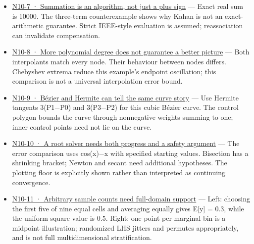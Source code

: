 \begin{itemize}
\item
  \href{Continuous\%20Notes/Computing\%20Foundations\%20-\%20From\%20Bits\%20to\%20C++\%20and\%20Systems\%20APIs\#Figure\%20N10-7\%20—\%20Summation\%20is\%20an\%20algorithm,\%20not\%20just\%20a\%20plus\%20sign}{N10-7 · Summation is an algorithm, not just a plus sign} --- Exact real sum is 10000. The three-term counterexample shows why Kahan is not an exact-arithmetic guarantee. Strict IEEE-style evaluation is assumed; reassociation can invalidate compensation.
\item
  \href{Continuous\%20Notes/Computing\%20Foundations\%20-\%20From\%20Bits\%20to\%20C++\%20and\%20Systems\%20APIs\#Figure\%20N10-8\%20—\%20More\%20polynomial\%20degree\%20does\%20not\%20guarantee\%20a\%20better\%20picture}{N10-8 · More polynomial degree does not guarantee a better picture} --- Both interpolants match every node. Their behaviour between nodes differs. Chebyshev extrema reduce this example's endpoint oscillation; this comparison is not a universal interpolation error bound.
\item
  \href{Continuous\%20Notes/Computing\%20Foundations\%20-\%20From\%20Bits\%20to\%20C++\%20and\%20Systems\%20APIs\#Figure\%20N10-9\%20—\%20Bézier\%20and\%20Hermite\%20can\%20tell\%20the\%20same\%20curve\%20story}{N10-9 · Bézier and Hermite can tell the same curve story} --- Use Hermite tangents 3(P1−P0) and 3(P3−P2) for this cubic Bézier curve. The control polygon bounds the curve through nonnegative weights summing to one; inner control points need not lie on the curve.
\item
  \href{Continuous\%20Notes/Computing\%20Foundations\%20-\%20From\%20Bits\%20to\%20C++\%20and\%20Systems\%20APIs\#Figure\%20N10-10\%20—\%20A\%20root\%20solver\%20needs\%20both\%20progress\%20and\%20a\%20safety\%20argument}{N10-10 · A root solver needs both progress and a safety argument} --- The error comparison uses cos(x)−x with specified starting values. Bisection has a shrinking bracket; Newton and secant need additional hypotheses. The plotting floor is explicitly shown rather than interpreted as continuing convergence.
\item
  \href{Continuous\%20Notes/Computing\%20Foundations\%20-\%20From\%20Bits\%20to\%20C++\%20and\%20Systems\%20APIs\#Figure\%20N10-11\%20—\%20Arbitrary\%20sample\%20counts\%20need\%20full-domain\%20support}{N10-11 · Arbitrary sample counts need full-domain support} --- Left: choosing the first five of nine equal cells and averaging equally gives E{[}y{]} = 0.3, while the uniform-square value is 0.5. Right: one point per marginal bin is a midpoint illustration; randomized LHS jitters and permutes appropriately, and is not full multidimensional stratification.

\end{itemize}
